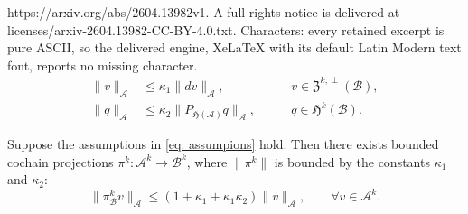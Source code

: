 \documentclass[10pt,a4paper]{amsart}
\newcommand{\Ac}{\mathcal{A}}
\newcommand{\Bc}{\mathcal{B}}
\newcommand{\Hf}{\mathfrak{H}}
\begin{document}
https://arxiv.org/abs/2604.13982v1. A full rights notice is delivered at licenses/arxiv-2604.13982-CC-BY-4.0.txt. Characters: every retained excerpt is pure ASCII, so the delivered engine, XeLaTeX with its default Latin Modern text font, reports no missing character.
\begin{subequations}\label{eq: assumpions}
\begin{align}\label{eq: ass1}
\|v\|_\Ac &\leq \kappa_1 \|dv\|_\Ac, \qquad &v \in \mathfrak{Z}^{k,\perp}(\Bc), \\
\|q\|_\Ac &\leq \kappa_2 \|P_{\mathfrak{H}(\Ac)} q\|_\Ac, \qquad &q \in \Hf^k(\Bc). \label{eq: ass2}
\end{align}   
\end{subequations}

\begin{theorem}\label{theorem: existence of bcp}
Suppose the assumptions in \cref{eq: assumpions} hold. Then there exists bounded cochain projections $\pi^k: \Ac^k \to \Bc^k$, where $\|\pi^k\|$ is bounded by the constants $\kappa_1$ and $\kappa_2$:
\begin{equation}
\|\pi^k_\Bc v \|_\Ac \leq (1 + \kappa_1 + \kappa_1 \kappa_2) \|v\|_\Ac, \qquad \forall v \in \Ac^k.
\end{equation}
\end{theorem}
\end{document}
